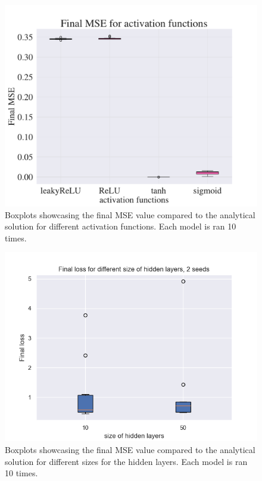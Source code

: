 \begin{figure}[h!]
    \centering
    \includegraphics[width=1.0\linewidth]{project_3/plots/activation_search.pdf}
    \caption{Boxplots showcasing the final MSE value compared to the analytical solution for different activation functions. Each model is ran 10 times.}
    \label{fig:boxplots_activations}
\end{figure}

\begin{figure}[h!]
    \centering
    \includegraphics[width=1.0\linewidth]{project_3/plots/value_layers_search.png}
    \caption{Boxplots showcasing the final MSE value compared to the analytical solution for different sizes for the hidden layers. Each model is ran 10 times. }
    \label{fig:boxplots_size_of_layers}
\end{figure}

